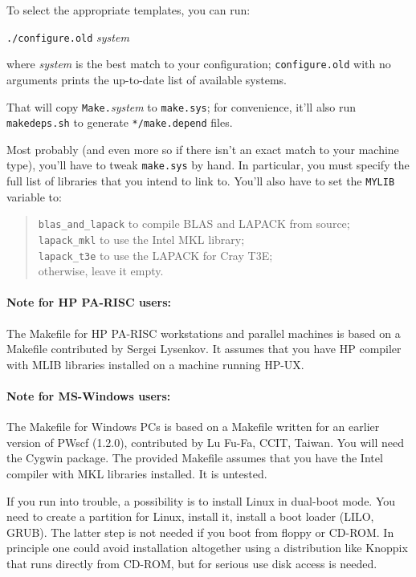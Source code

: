 \documentclass[12pt,a4paper]{article}
\begin{document}
To select the appropriate templates, you can run:
\medskip

\texttt{./configure.old} \emph{system}
\medskip

\noindent
where \emph{system} is the best match to your configuration;
\texttt{configure.old} with no arguments prints the up-to-date list of
available systems.

That will copy \texttt{Make.}\emph{system} to \texttt{make.sys}; for
convenience, it'll also run \texttt{makedeps.sh} to generate
\texttt{*/make.depend} files.

Most probably (and even more so if there isn't an exact match to your
machine type), you'll have to tweak \texttt{make.sys} by hand.
In particular, you must specify the full list of libraries that
you intend to link to.
You'll also have to set the \texttt{MYLIB} variable to:
\begin{quote}
  \texttt{blas\_and\_lapack} to compile BLAS and LAPACK from source;\\
  \texttt{lapack\_mkl} to use the Intel MKL library;\\
  \texttt{lapack\_t3e} to use the LAPACK for Cray T3E;\\
  otherwise, leave it empty.
\end{quote}

\paragraph{Note for HP PA-RISC users:} 

The Makefile for HP PA-RISC workstations and parallel machines is
based on a Makefile contributed by Sergei Lysenkov.
It assumes that you have HP compiler with MLIB libraries installed on
a machine running HP-UX.

\paragraph{Note for MS-Windows users:} 

The Makefile for Windows PCs is based on a Makefile written for an
earlier version of PWscf (1.2.0), contributed by Lu Fu-Fa, CCIT,
Taiwan. You will need the Cygwin package. The provided Makefile
assumes that you have the Intel compiler with MKL libraries installed.
It is untested.

If you run into trouble, a possibility is to install Linux in 
dual-boot mode. You need to create a partition for Linux, 
install it, install a boot loader (LILO, GRUB). The latter step
is not needed if you boot from floppy or CD-ROM. In principle 
one could avoid installation altogether using a distribution 
like Knoppix that runs directly from CD-ROM, but for serious use 
disk access is needed.
\end{document}
